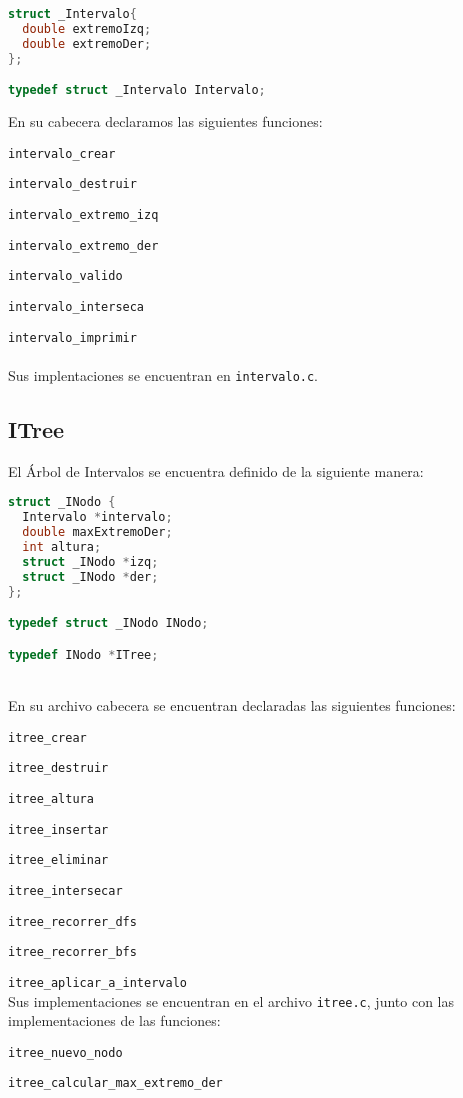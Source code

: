 \documentclass[]{article}
\begin{document}
\begin{lstlisting}[language=C]
struct _Intervalo{
  double extremoIzq;
  double extremoDer;
};

typedef struct _Intervalo Intervalo;
\end{lstlisting}
En su cabecera declaramos las siguientes funciones:

\verb|intervalo_crear|

\verb|intervalo_destruir|

\verb|intervalo_extremo_izq|

\verb|intervalo_extremo_der|

\verb|intervalo_valido|

\verb|intervalo_interseca|

\verb|intervalo_imprimir|\\\\
Sus implentaciones se encuentran en \verb|intervalo.c|.
\newpage
\subsection{ITree}
El Árbol de Intervalos se encuentra definido de la siguiente manera:

\begin{lstlisting}[language=C]
struct _INodo {
  Intervalo *intervalo;
  double maxExtremoDer;
  int altura;
  struct _INodo *izq;
  struct _INodo *der;
};

typedef struct _INodo INodo;

typedef INodo *ITree;
\end{lstlisting}
\\
En su archivo cabecera se encuentran declaradas las siguientes funciones:

\verb|itree_crear|

\verb|itree_destruir|

\verb|itree_altura|

\verb|itree_insertar|

\verb|itree_eliminar|

\verb|itree_intersecar|

\verb|itree_recorrer_dfs|

\verb|itree_recorrer_bfs|

\verb|itree_aplicar_a_intervalo|
\\
Sus implementaciones se encuentran en el archivo \verb|itree.c|, junto con las implementaciones de las funciones:

\verb|itree_nuevo_nodo|

\verb|itree_calcular_max_extremo_der|
\end{document}
